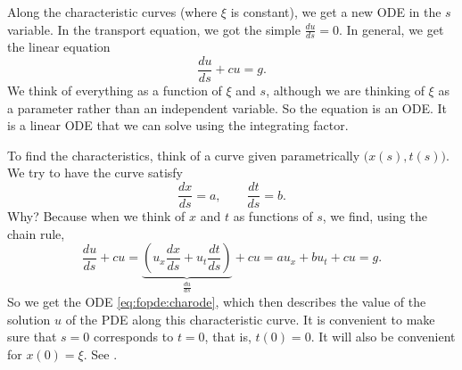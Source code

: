 Along the characteristic curves (where $\xi$ is constant), we get a
new ODE in the $s$ variable.  In the transport
equation, we got the simple $\frac{du}{ds} = 0$.  In general,
we get the linear equation
\begin{equation} \label{eq:fopde:charode}
\frac{du}{ds} + c u = g.
\end{equation}
We think of everything as a function of $\xi$ and $s$,
although
we are thinking of $\xi$ as a parameter rather than an independent variable.
So the equation is an ODE\@.  It is a linear
ODE that we can solve using the integrating factor.

To find the characteristics, think of a curve given parametrically
$\bigl(x(s),t(s)\bigr)$.  We try to have the curve satisfy
\begin{equation*}
\frac{dx}{ds} = a, \qquad \frac{dt}{ds} = b .
\end{equation*}
Why?
Because when we think of $x$ and $t$ as functions of $s$, we find, using the
chain rule,
\begin{equation*}
\frac{du}{ds} + c u =
\underbrace{\left( u_x \frac{dx}{ds} + u_t
\frac{dt}{ds}\right)}_{\frac{du}{ds}} + c u =
a u_x + b u_t + c u = g .
\end{equation*}
So we get the ODE \eqref{eq:fopde:charode}, which
then describes the value of the solution $u$ of
the PDE along
this characteristic curve.
It is convenient to make sure that $s=0$
corresponds to $t=0$, that is, $t(0) = 0$.  It will also be convenient for
$x(0) = \xi$.
See .

\begin{myfig}
\capstart
{}
\caption{General characteristic curve.\label{fopde:charcurvecurvy}}
\end{myfig}


